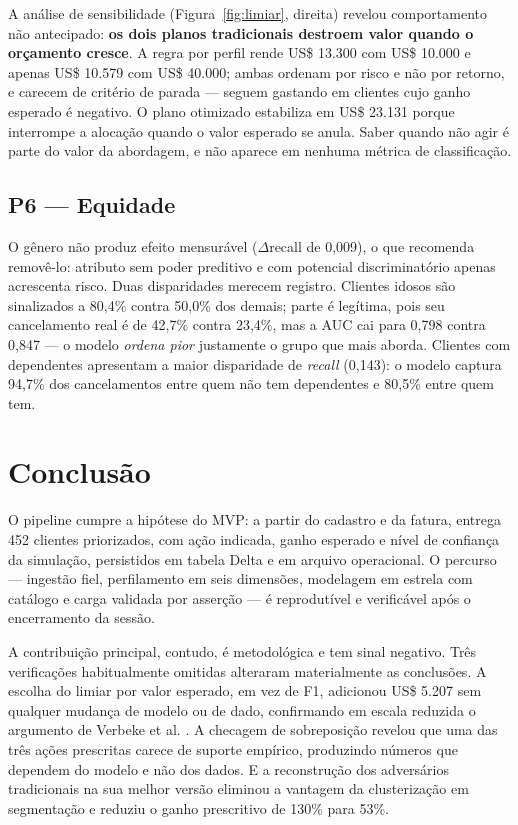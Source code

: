 \documentclass[10pt,a4paper]{article}
\begin{document}
A análise de sensibilidade (Figura~\ref{fig:limiar}, direita) revelou comportamento não
antecipado: \textbf{os dois planos tradicionais destroem valor quando o orçamento cresce}. A
regra por perfil rende US\$ 13.300 com US\$ 10.000 e apenas US\$ 10.579 com US\$ 40.000;
ambas ordenam por risco e não por retorno, e carecem de critério de parada --- seguem gastando
em clientes cujo ganho esperado é negativo. O plano otimizado estabiliza em US\$ 23.131 porque
interrompe a alocação quando o valor esperado se anula. Saber quando não agir é parte do valor
da abordagem, e não aparece em nenhuma métrica de classificação.


\subsection{P6 --- Equidade}

O gênero não produz efeito mensurável (\(\Delta\)recall de 0,009), o que recomenda removê-lo:
atributo sem poder preditivo e com potencial discriminatório apenas acrescenta risco. Duas
disparidades merecem registro. Clientes idosos são sinalizados a 80,4\% contra 50,0\% dos
demais; parte é legítima, pois seu cancelamento real é de 42,7\% contra 23,4\%, mas a AUC cai
para 0,798 contra 0,847 --- o modelo \emph{ordena pior} justamente o grupo que mais aborda.
Clientes com dependentes apresentam a maior disparidade de \emph{recall} (0,143): o modelo
captura 94,7\% dos cancelamentos entre quem não tem dependentes e 80,5\% entre quem tem.

\section{Conclusão}

O pipeline cumpre a hipótese do MVP: a partir do cadastro e da fatura, entrega 452 clientes
priorizados, com ação indicada, ganho esperado e nível de confiança da simulação, persistidos em
tabela Delta e em arquivo operacional. O percurso --- ingestão fiel, perfilamento em seis
dimensões, modelagem em estrela com catálogo e carga validada por asserção --- é reprodutível e
verificável após o encerramento da sessão.

A contribuição principal, contudo, é metodológica e tem sinal negativo. Três verificações
habitualmente omitidas alteraram materialmente as conclusões. A escolha do limiar por
valor esperado, em vez de F1, adicionou US\$ 5.207 sem qualquer mudança de modelo ou de
dado, confirmando em escala reduzida o argumento de Verbeke et al. \cite{verbeke}. A checagem de
sobreposição revelou que uma das três ações prescritas carece de suporte empírico,
produzindo números que dependem do modelo e não dos dados. E a reconstrução dos
adversários tradicionais na sua melhor versão eliminou a vantagem da clusterização em
segmentação e reduziu o ganho prescritivo de 130\% para 53\%.
\end{document}
